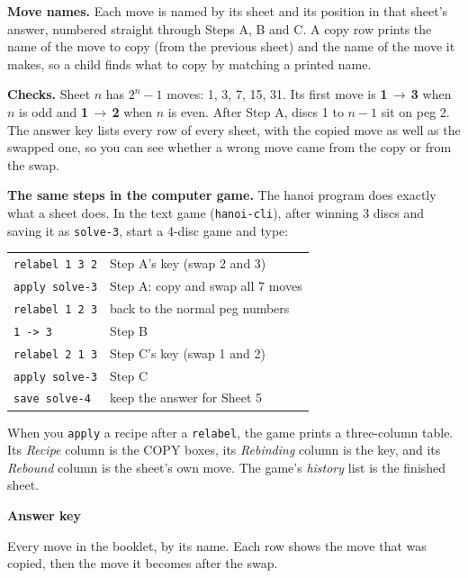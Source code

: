 \documentclass[12pt]{article}
\newcommand{\N}[1]{\textcolor{pegc#1}{\bfseries #1}}
\newcommand{\M}[2]{\N{#1}\,\arr\,\N{#2}}
\newcommand{\arr}{\ensuremath{\rightarrow}}
\begin{document}
\textbf{Move names.} Each move is named by its sheet and its position in that
sheet's answer, numbered straight through Steps A, B and C. A copy row prints
the name of the move to copy (from the previous sheet) and the name of the
move it makes, so a child finds what to copy by matching a printed name.

\textbf{Checks.} Sheet $n$ has $2^n-1$ moves: 1, 3, 7, 15, 31. Its first move
is \M{1}{3} when $n$ is odd and \M{1}{2} when $n$ is even. After Step A,
discs 1 to $n-1$ sit on peg 2. The answer key lists every row of every sheet,
with the copied move as well as the swapped one, so you can see whether a
wrong move came from the copy or from the swap.

\textbf{The same steps in the computer game.} The hanoi program does exactly
what a sheet does. In the text game (\texttt{hanoi-cli}), after winning 3
discs and saving it as \texttt{solve-3}, start a 4-disc game and type:
\begin{center}
\begin{tabular}{ll}
  \texttt{relabel 1 3 2} & Step A's key (swap 2 and 3)\\
  \texttt{apply solve-3} & Step A: copy and swap all 7 moves\\
  \texttt{relabel 1 2 3} & back to the normal peg numbers\\
  \texttt{1 -> 3}        & Step B\\
  \texttt{relabel 2 1 3} & Step C's key (swap 1 and 2)\\
  \texttt{apply solve-3} & Step C\\
  \texttt{save solve-4}  & keep the answer for Sheet 5
\end{tabular}
\end{center}
When you \texttt{apply} a recipe after a \texttt{relabel}, the game prints a
three-column table. Its \emph{Recipe} column is the COPY boxes, its
\emph{Rebinding} column is the key, and its \emph{Rebound} column is the
sheet's own move. The game's \emph{history} list is the finished sheet.
\newpage

\begin{center}
  {\LARGE\bfseries Answer key}
\end{center}
Every move in the booklet, by its name. Each row shows the move that was
copied, then the move it becomes after the swap.
\end{document}
